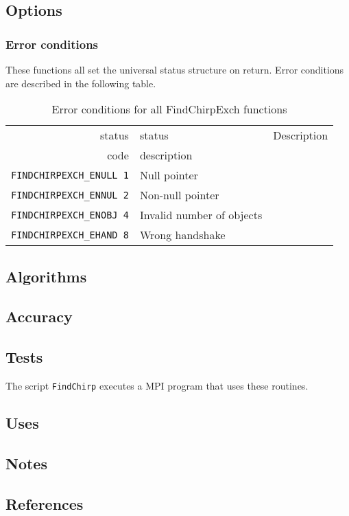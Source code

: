 \documentclass{article}
\begin{document}
\subsection{Options}

\subsubsection{Error conditions}

These functions all set the universal status structure on return.
Error conditions are described in the following table.

\begin{table}
\begin{tabular}{|r|l|p{2in}|}\hline
status  & status          & Description\\
code    & description     & \\\hline
\verb+FINDCHIRPEXCH_ENULL 1+ & Null pointer \\
\verb+FINDCHIRPEXCH_ENNUL 2+ & Non-null pointer \\
\verb+FINDCHIRPEXCH_ENOBJ 4+ & Invalid number of objects \\
\verb+FINDCHIRPEXCH_EHAND 8+ & Wrong handshake \\
\hline
\end{tabular}
\caption{Error conditions for all FindChirpExch functions}\label{tbl:CV}
\end{table}


\subsection{Algorithms}

\subsection{Accuracy}

\subsection{Tests}

The script \verb+FindChirp+ executes a MPI program that uses these routines.

\subsection{Uses}

\subsection{Notes}

\subsection{References}
\end{document}
